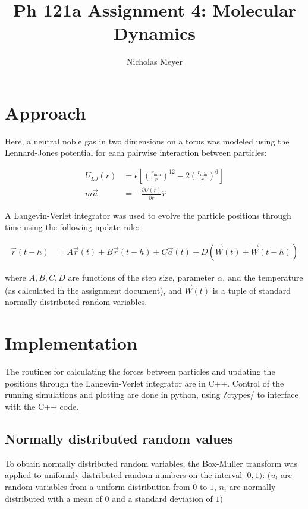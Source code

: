 \documentclass[12pt]{article}
\newcommand{\parderplace}[2]{\frac{\partial{#1}}{\partial{#2}}}
\begin{document}
\title{Ph 121a Assignment 4: Molecular Dynamics}
\author{Nicholas Meyer}

\maketitle

\section{Approach}

Here, a neutral noble gas in two dimensions on a torus was modeled using the
Lennard-Jones potential for each pairwise interaction between particles:

\begin{align}
  U_{LJ}(r) &= \epsilon \left[\left(\frac{r_{\text{min}}}{r}\right)^{12}
  - 2\left(\frac{r_{\text{min}}}{r}\right)^6\right] \\
  m\vec{a} &= -\parderplace{U(r)}{r}\hat{r}
\end{align}

A Langevin-Verlet integrator was used to evolve the particle positions through
time using the following update rule:

\begin{align}
  \vec{r}(t + h)
  &= A\vec{r}(t) + B\vec{r}(t - h) + C\vec{a}(t)
  + D(\vec{W}(t) + \vec{W}(t - h))
\end{align}

where $A, B, C, D$ are functions of the step size, parameter $\alpha$, and
the temperature (as calculated in the assignment document), and
$\vec{W}(t)$ is a tuple of standard normally distributed random variables.

\section{Implementation}

The routines for calculating the forces between particles and updating the
positions through the Langevin-Verlet integrator are in C++.
Control of the running simulations and plotting are done in python, using
\texttt/ctypes/ to interface with the C++ code.

\subsection{Normally distributed random values}

To obtain normally distributed random variables, the Box-Muller transform
was applied to uniformly distributed random numbers on the interval $[0, 1)$:
($u_i$ are random variables from a uniform distribution from $0$ to $1$,
$n_i$ are normally distributed with a mean of $0$ and a standard deviation
of $1$)
\end{document}
